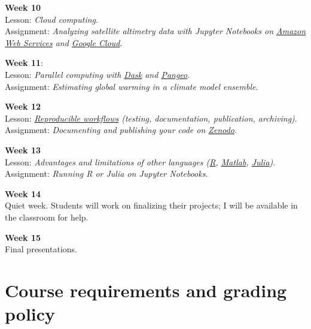 \documentclass[11pt]{article}
\begin{document}
\textbf{Week 10}\\
 Lesson: \textit{Cloud computing}.\\
 Assignment: \textit{Analyzing satellite altimetry data with Jupyter Notebooks on \href{https://aws.amazon.com}{Amazon Web Services} and \href{https://cloud.google.com}{Google Cloud}}.

 \textbf{Week 11}:\\
 Lesson:  \textit{Parallel computing with \href{https://dask.org/}{Dask} and \href{https://pangeo.io/}{Pangeo}}.\\
  Assignment: \textit{Estimating global warming in a climate model ensemble}.

\textbf{Week 12}\\
 Lesson: \textit{\href{http://www.practicereproducibleresearch.org/core-chapters/3-basic.html}{Reproducible workflows} (testing, documentation, publication, archiving)}.\\
 Assignment: \textit{Documenting and publishing your code on \href{https://zenodo.org}{Zenodo}}.

\textbf{Week 13}\\
 Lesson: \textit{Advantages and limitations of other languages (\href{https://www.r-project.org/about.html}{R}, \href{https://www.mathworks.com/products/matlab.html}{Matlab}, \href{https://julialang.org/}{Julia})}.\\
 Assignment: \textit{Running R or Julia on Jupyter Notebooks}.

\textbf{Week 14}\\
Quiet week. Students will work on finalizing their projects; I will be available  in the classroom for help.

\textbf{Week 15}\\
Final presentations.


\section*{Course requirements and grading policy}
\end{document}
